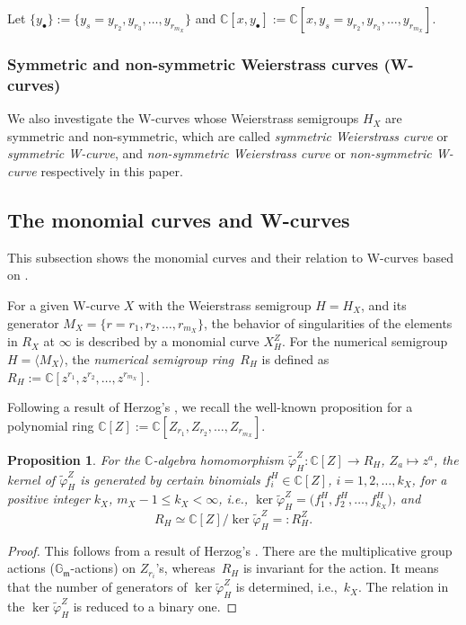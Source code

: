 \documentclass[10pt,a4paper]{amsart}
\def\CC{{\mathbb C}}
\def\GG{{\mathbb G}}
\def\fm{{\mathfrak m}}
\def\tvarphi{{\widetilde \varphi}}
\numberwithin{equation}{section}
\newtheorem{Proposition}[Theorem]{Proposition}
 { \theoremstyle{definition}
\newtheorem{Definition}[Theorem]{Definition}
\newtheorem{Note}[Theorem]{Note}
\newtheorem{Example}[Theorem]{Example}
\newtheorem{Remark}[Theorem]{Remark} }
\begin{document}
Let $\{y_{\bullet}\}:=\{y_{s}=y_{r_2}, y_{r_3}, \dots, y_{r_{m_X}}\}$ and $\CC[x, y_{\bullet}]:=\CC[x, y_{s}=y_{r_2}, y_{r_3}, \dots, y_{r_{m_X}}]$.

\subsubsection{Symmetric and non-symmetric Weierstrass curves (W-curves)}\label{2sssec:SymmWcurve}

We also investigate the W-curves whose Weierstrass semigroups $H_X$ are symmetric and non-symmetric, which are called {\emph{symmetric Weierstrass curve}} or {\emph{symmetric W-curve}}, and {\emph{non-symmetric Weierstrass curve}} or {\emph{non-symmetric W-curve}} respectively in this paper.

\subsection{The monomial curves and W-curves}\label{2ssc:MCurve}

This subsection shows the monomial curves and their relation to W-curves based on \cite{KM2020, KMP16, KMP19}.

For a given W-curve $X$ with the Weierstrass semigroup $H=H_X$, and its generator $M_X=\{r=r_1, r_2, \dots, r_{m_X}\}$, the behavior of singularities of the elements in $R_X$ at $\infty$ is described by a monomial curve $X_H^Z$.
For the numerical semigroup $H=\langle M_X\rangle$, the \emph{numerical semigroup ring}~$R_H$ is defined as $R_H:=\CC[ z^{r_1}, z^{r_2}, \dots, z^{r_{m_X}}]$.

Following a result of Herzog's \cite{Herzog70}, we recall the well-known proposition for a polynomial ring $\CC[Z]:=\CC[Z_{r_1}, Z_{r_2}, \dots, Z_{r_{m_X}}]$.
\begin{Proposition} \label{2pr:R_H}
For the $\CC$-algebra homomorphism $ \tvarphi^Z_H\colon \CC[Z] \to R_H$, $Z_a\mapsto z^a$, the kernel of $\tvarphi^Z_H$ is generated by certain binomials $f^H_i \in \CC[Z]$, $i=1,2,\dots,k_X$, for a positive integer $k_X$, $m_X-1\le k_X< \infty$, i.e., $\ker\tvarphi^Z_H=\big(f^H_1, f^H_2, \dots, f^H_{k_X}\big)$, and
\[
R_H \simeq \CC[Z]/ \ker\tvarphi^Z_H=:R^Z_H.
\]
\end{Proposition}

\begin{proof}This follows from a result of Herzog's \cite{Herzog70}.
There are the multiplicative group actions ($\GG_\fm$-actions) on $Z_{r_i}$'s, whereas~$R_H$ is invariant for the action.
It means that the number of generators of $\ker\tvarphi^Z_H$ is determined, i.e.,~$k_X$.
The relation in the $\ker\tvarphi^Z_H$ is reduced to a binary one.
\end{proof}
\end{document}
